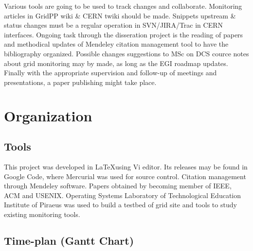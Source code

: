 Various tools are going to be used to track changes and collaborate. Monitoring articles in GridPP wiki \& CERN twiki should be made. Snippets upstream \& status changes must be a regular operation in SVN/JIRA/Trac in CERN interfaces. Ongoing task through the disseration project is the reading of papers and methodical updates of Mendeley citation management tool to have the bibliography organized. Possible changes suggestions to MSc on DCS cource notes about grid monitoring may by made, as long as the EGI roadmap updates. Finally with the appropriate supervision and follow-up of meetings and presentations, a paper publishing might take place.

\section{Organization}

\subsection[Tools]{Tools}
This project was developed in \LaTeX using Vi editor. Its releases may be found in Google Code, where Mercurial was used for source control. Citation management through Mendeley software. Papers obtained by becoming member of IEEE, ACM and USENIX. Operating Systems Laboratory of Technological Education Institute of Piraeus was used to build a testbed of grid site and tools to study existing monitoring tools.

\subsection[Time plan]{Time-plan (Gantt Chart)}


